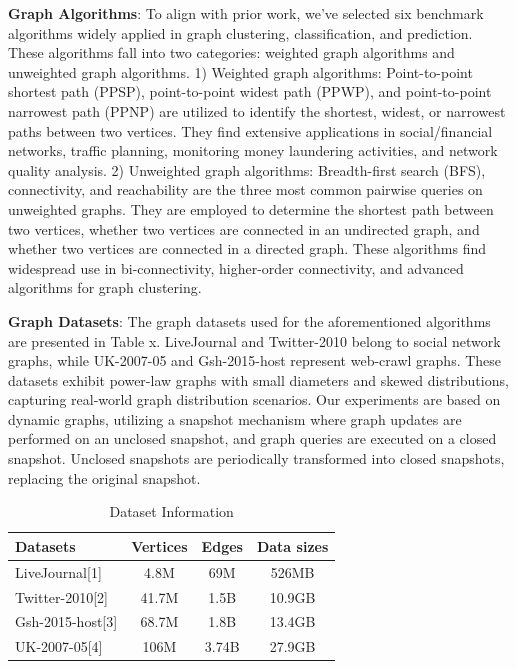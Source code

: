 \documentclass[lettersize,journal]{IEEEtran} %
\begin{document}
{\bf{Graph Algorithms}}: To align with prior work\cite{pnp}\cite{tripoline}\cite{sgraph}\cite{glign}, we've selected six benchmark algorithms widely applied in graph clustering, classification, and prediction. These algorithms fall into two categories: weighted graph algorithms and unweighted graph algorithms. 1) Weighted graph algorithms: Point-to-point shortest path (PPSP)\cite{ppsp_1}\cite{ppsp_2}\cite{ppsp_3}, point-to-point widest path (PPWP)\cite{ppwp}, and point-to-point narrowest path (PPNP)\cite{ppnp} are utilized to identify the shortest, widest, or narrowest paths between two vertices. They find extensive applications in social/financial networks, traffic planning, monitoring money laundering activities, and network quality analysis. 2) Unweighted graph algorithms: Breadth-first search (BFS)\cite{bfs}, connectivity\cite{reachability_1}\cite{reachability_2}\cite{reachability_3}, and reachability\cite{connectivity} are the three most common pairwise queries on unweighted graphs. They are employed to determine the shortest path between two vertices, whether two vertices are connected in an undirected graph, and whether two vertices are connected in a directed graph. These algorithms find widespread use in bi-connectivity, higher-order connectivity, and advanced algorithms for graph clustering.

{\bf{Graph Datasets}}: The graph datasets used for the aforementioned algorithms are presented in Table x. LiveJournal and Twitter-2010 belong to social network graphs, while UK-2007-05 and Gsh-2015-host represent web-crawl graphs. These datasets exhibit power-law graphs with small diameters and skewed distributions, capturing real-world graph distribution scenarios. Our experiments are based on dynamic graphs, utilizing a snapshot mechanism where graph updates are performed on an unclosed snapshot, and graph queries are executed on a closed snapshot. Unclosed snapshots are periodically transformed into closed snapshots, replacing the original snapshot.

\begin{table}[h]
    \centering
    \begin{tabular}{lccc}
    \hline
    Datasets          & Vertices & Edges  & Data sizes \\
    \hline
    LiveJournal[1]    & 4.8M     & 69M    & 526MB      \\
    Twitter-2010[2]   & 41.7M    & 1.5B   & 10.9GB     \\
    Gsh-2015-host[3]  & 68.7M    & 1.8B   & 13.4GB     \\
    UK-2007-05[4]     & 106M     & 3.74B  & 27.9GB     \\
    \hline
    \end{tabular}
    \caption{Dataset Information}
    \end{table}
\end{document}

